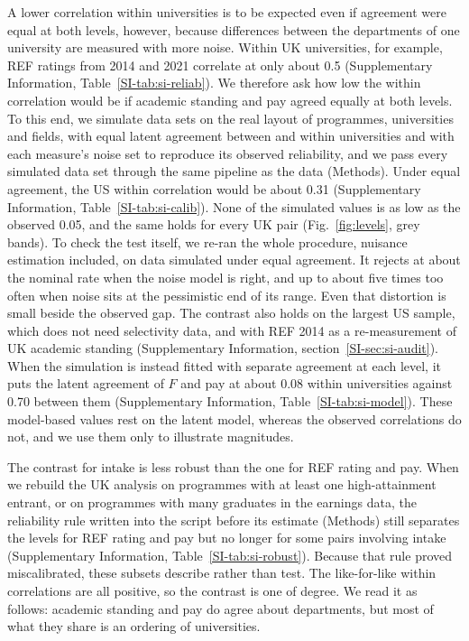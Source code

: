\documentclass[11pt]{article}
\newcommand{\SIsec}[1]{Supplementary Information, section~\ref{SI-#1}}
\newcommand{\SItab}[1]{Supplementary Information, Table~\ref{SI-#1}}
\begin{document}
A lower correlation within universities is to be expected even if agreement were equal at both levels, however,
because differences between the departments of one university are measured with more noise. Within UK universities,
for example, REF ratings from 2014 and 2021 correlate at only about 0.5 (\SItab{tab:si-reliab}). We therefore ask how
low the within correlation would be if academic standing and pay agreed equally at both levels. To this end, we
simulate data sets on the real layout of programmes, universities and fields, with equal latent agreement between and
within universities and with each measure's noise set to reproduce its observed reliability, and we pass every
simulated data set through the same pipeline as the data (Methods). Under equal agreement, the US within
correlation would be about 0.31 (\SItab{tab:si-calib}). None of the simulated values is as low as the observed 0.05,
and the same holds for every UK pair (Fig.~\ref{fig:levels}, grey bands). To check the test itself, we re-ran the
whole procedure, nuisance estimation included, on data simulated under equal agreement. It rejects at about the
nominal rate when the noise model is right, and up to about five times too often when noise sits at the pessimistic
end of its range. Even that distortion is small beside the observed gap. The contrast also holds on the largest US sample, which does not need selectivity data,
and with REF 2014 as a re-measurement of UK academic standing (\SIsec{sec:si-audit}). When the simulation is instead fitted with
separate agreement at each level, it puts the latent agreement of $F$ and pay at about 0.08 within universities against
0.70 between them (\SItab{tab:si-model}). These model-based values rest on the latent model, whereas the observed
correlations do not, and we use them only to illustrate magnitudes.

The contrast for intake is less robust than the one for REF rating and pay. When we rebuild the UK analysis on
programmes with at least one high-attainment entrant, or on programmes with many graduates in the earnings data, the
reliability rule written into the script before its estimate (Methods) still separates the levels for REF rating and
pay but no longer for some pairs involving intake (\SItab{tab:si-robust}). Because that rule proved miscalibrated,
these subsets describe rather than test. The like-for-like within correlations are all positive, so the contrast is
one of degree. We read it as follows: academic standing and pay do agree about departments, but most of what they
share is an ordering of universities.
\end{document}
